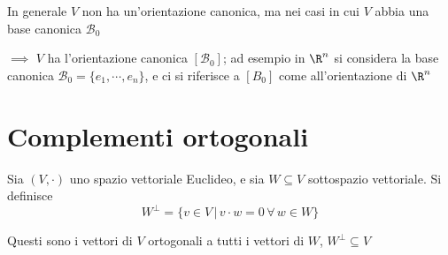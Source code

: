 In generale $ V $ non ha un'orientazione canonica, ma nei casi in cui $ V $ abbia una base canonica $ \mathscr{B}_0 $ 

$\implies$ $ V $ ha l'orientazione canonica $ [ \mathscr{B}_0] $; ad esempio in $ \R^{n} $ si considera la base canonica $ \mathscr{B}_0=\{e_1,\cdots,e_{n} \} $, e ci si riferisce a $ [B_{0} ] $ come all'orientazione di $ \R^{n} $

\section{Complementi ortogonali}

Sia $ (V, \cdot ) $ uno spazio vettoriale Euclideo, e sia $ W \subseteq V $ sottospazio vettoriale. Si definisce \[ W^{\bot }=\{v \in V\,|\, v \cdot w = 0 \, \forall\, w \in W\}\]

Questi sono i vettori di $ V $ ortogonali a tutti i vettori di $ W$, $ W^{\bot} \subseteq V $


